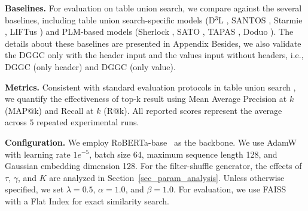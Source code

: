 \begin{table}[t]
  \centering
  \caption{Statistics of datasets}
  \label{tab:datasets}
\end{table}

\noindent\textbf{Baselines.} %
For evaluation on table union search, we compare against the several baselines, including table union search-specific models (D$^3$L \cite{bogatu2020dataset}, SANTOS \cite{khatiwada2023santos}, Starmie \cite{fan2022semantics}, LIFTus \cite{qiu2025liftus}) and PLM-based models (Sherlock \cite{hulsebos2019sherlock}, SATO \cite{zhang2019sato}, TAPAS \cite{herzig2020tapas}, Doduo \cite{jiang2024doduo}). The details about these baselines are presented in Appendix Besides, we also validate the DGGC only with the header input and the values input without headers, i.e., DGGC (only header) and DGGC (only value).

\noindent\textbf{Metrics.}
Consistent with standard evaluation protocols in table union search \cite{khatiwada2023santos,fan2022semantics,qiu2025liftus}, we quantify the effectiveness of top-k result using Mean Average Precision at $k$ (MAP@k) and Recall at $k$ (R@k). All reported scores represent the average across $5$ repeated experimental runs.  

\noindent\textbf{Configuration.} %
We employ RoBERTa-base~\cite{liu2019roberta} as the backbone. We use AdamW~\cite{loshchilov2019decoupled} with learning rate \(1e^{-5}\), batch size 64, maximum sequence length 128, and Gaussian embedding dimension 128. For the filter-shuffle generator, the effects of \(\tau\), \(\gamma\), and \(K\) are analyzed in Section~\ref{sec_param_analysis}. Unless otherwise specified, we set \(\lambda=0.5\), \(\alpha=1.0\), and \(\beta=1.0\). For evaluation, we use FAISS~\cite{johnson2019billion} with a Flat Index for exact similarity search.

